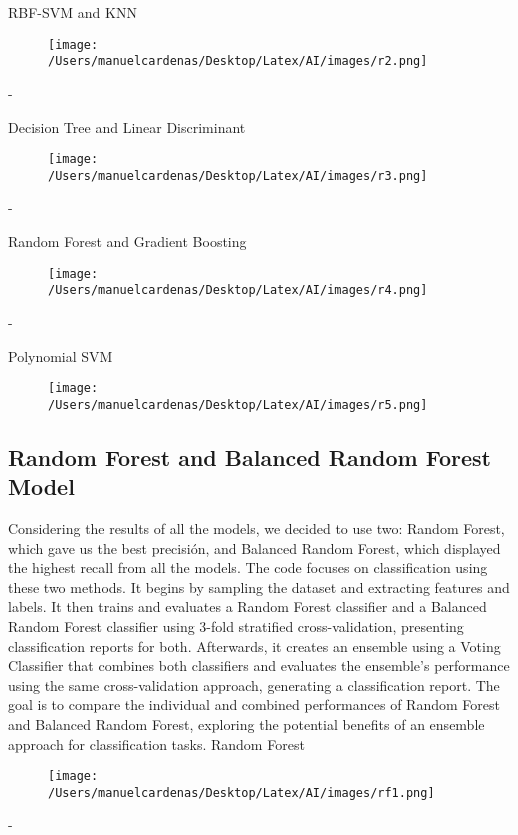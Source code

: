 \documentclass{article}
\begin{document}
    RBF-SVM and KNN
    \begin{figure}[h]
        \centering
        \texttt{[image: /Users/manuelcardenas/Desktop/Latex/AI/images/r2.png]}
        \label{fig:r2}
    \end{figure}
    - \pagebreak

    Decision Tree and Linear Discriminant
    \begin{figure}[h]
        \centering
        \texttt{[image: /Users/manuelcardenas/Desktop/Latex/AI/images/r3.png]}
        \label{fig:r3}
    \end{figure}
    - \pagebreak

    Random Forest and Gradient Boosting
    \begin{figure}[h]
        \centering
        \texttt{[image: /Users/manuelcardenas/Desktop/Latex/AI/images/r4.png]}
        \label{fig:r4}
    \end{figure}
    - \pagebreak

    Polynomial SVM
    \begin{figure}[h]
        \centering
        \texttt{[image: /Users/manuelcardenas/Desktop/Latex/AI/images/r5.png]}
        \label{fig:r5}
    \end{figure}

    \subsection{Random Forest and Balanced Random Forest Model}

    Considering the results of all the models, we decided to use two: Random Forest, which gave us the best precisión, 
    and Balanced Random Forest, which displayed the highest recall from all the models. The code focuses on classification 
    using these two methods. It begins by sampling the dataset and extracting features and labels. It then trains and evaluates 
    a Random Forest classifier and a Balanced Random Forest classifier using 3-fold stratified cross-validation, presenting 
    classification reports for both. Afterwards, it creates an ensemble using a Voting Classifier that combines both classifiers 
    and evaluates the ensemble's performance using the same cross-validation approach, generating a classification report. 
    The goal is to compare the individual and combined performances of Random Forest and Balanced Random Forest, exploring 
    the potential benefits of an ensemble approach for classification tasks.\pagebreak
    Random Forest
    \begin{figure}[h]
        \centering
        \texttt{[image: /Users/manuelcardenas/Desktop/Latex/AI/images/rf1.png]}
        \label{fig:rf1}
    \end{figure}
    - \pagebreak
\end{document}
